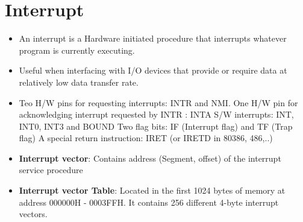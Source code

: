 \section{Interrupt}
\begin{itemize}
  \item An interrupt is a Hardware initiated procedure that interrupts whatever program is currently executing.
  \item Useful when interfacing with I/O devices that provide or require data at relatively low data transfer rate.
  \item Teo H/W pins for requesting interrupts: INTR and NMI. \newline
  One H/W pin for acknowledging interrupt requested by INTR : INTA \newline
  S/W interrupts: INT, INT0, INT3 and BOUND \newline
  Two flag bits: IF (Interrupt flag) and TF (Trap flag) \newline
  A special return instruction: IRET (or IRETD in 80386, 486,..)
  \item \textbf{Interrupt vector}: Contains address (Segment, offset) of the interrupt service procedure
  \item \textbf{Interrupt vector Table}: Located in the first 1024 bytes of memory at address 000000H - 0003FFH. It contains 256 different 4-byte interrupt vectors.
\end{itemize}
